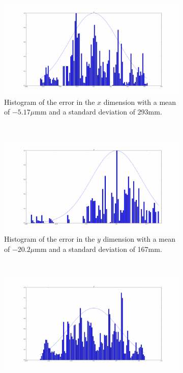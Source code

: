 \begin{figure}
  \begin{subfigure}{0.45\textwidth}
    \includegraphics[width=\textwidth]{figures/chapter3/norm_x}
    \caption{Histogram of the error in the $x$ dimension with a mean of $-5.17\mu$mm and a standard deviation of 293mm.}
  \end{subfigure}
~
  \begin{subfigure}{0.45\textwidth}
     \includegraphics[width=\textwidth]{figures/chapter3/norm_y}
     \caption{Histogram of the error in the $y$ dimension with a mean of $-20.2\mu$mm and a standard deviation of 167mm.}
  \label{fig:norm-y}
  \end{subfigure}
~
  \begin{subfigure}{0.45\textwidth}
     \includegraphics[width=\textwidth]{figures/chapter3/norm_z.pdf}

\end{subfigure}
\end{figure}
